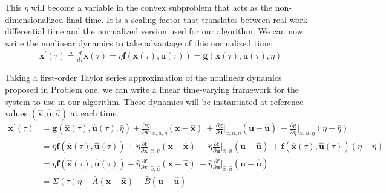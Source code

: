 This $\eta$ will become a variable in the convex subproblem that acts as the non-dimensionalized final time. It is a scaling factor that translates between real work differential time and the normalized version used for our algorithm. We can now write the nonlinear dynamics to take advantage of this normalized time:
\begin{align}
& \mathbf{x}^\prime(\tau) \triangleq \frac{d}{d\tau}\mathbf{x}(\tau) = \eta \mathbf{f}(\mathbf{x}(\tau), \mathbf{u}(\tau)) = \mathbf{g}(\mathbf{x}(\tau), \mathbf{u}(\tau), \eta)
\end{align}

Taking a first-order Taylor series approximation of the nonlinear dynamics proposed in Problem one, we can write a linear time-varying framework for the system to use in our algorithm. These dynamics will be instantiated at reference values $(\hat{\mathbf{x}}, \hat{\mathbf{u}}, \hat{\sigma})$ at each time. 
%
\begin{align}
\mathbf{x}^\prime(\tau) 
&= \mathbf{g}(\hat{\mathbf{x}}(\tau), \hat{\mathbf{u}}(\tau), \hat{\eta})
+ \frac{\partial \mathbf{g}}{\partial \mathbf{x}} \bigg\rvert_{\hat{x},\hat{u},\hat{\eta}} (\mathbf{x} - \hat{\mathbf{x}}) \ 
+ \frac{\partial \mathbf{g}}{\partial \mathbf{u}} \bigg\rvert_{\hat{x},\hat{u},\hat{\eta}} (\mathbf{u} - \hat{\mathbf{u}}) \ 
+ \frac{\partial \mathbf{g}}{\partial \eta} \bigg\rvert_{\hat{x},\hat{u},\hat{\eta}} (\eta - \hat{\eta}) \\
&= \hat{\eta} \mathbf{f}(\hat{\mathbf{x}}(\tau), \hat{\mathbf{u}}(\tau))
+ \hat{\eta} \frac{\partial \mathbf{f}}{\partial \mathbf{x}} \bigg\rvert_{\hat{x},\hat{u}} (\mathbf{x} - \hat{\mathbf{x}}) \
+ \hat{\eta} \frac{\partial \mathbf{f}}{\partial \mathbf{u}} \bigg\rvert_{\hat{x},\hat{u}} (\mathbf{u} - \hat{\mathbf{u}}) \
+ \mathbf{f}(\hat{\mathbf{x}}(\tau), \hat{\mathbf{u}}(\tau)) (\eta - \hat{\eta}) \\
&= {\eta} \mathbf{f}(\hat{\mathbf{x}}(\tau), \hat{\mathbf{u}}(\tau))
+ \hat{\eta} \frac{\partial \mathbf{f}}{\partial \mathbf{x}} \bigg\rvert_{\hat{x},\hat{u}} (\mathbf{x} - \hat{\mathbf{x}}) \
+ \hat{\eta} \frac{\partial \mathbf{f}}{\partial \mathbf{u}} \bigg\rvert_{\hat{x},\hat{u}} (\mathbf{u} - \hat{\mathbf{u}}) \\ 
& = \Sigma(\tau)\eta + \bar{A} (\mathbf{x} - \hat{\mathbf{x}}) + \bar{B}(\mathbf{u} - \hat{\mathbf{u}})
\end{align}

